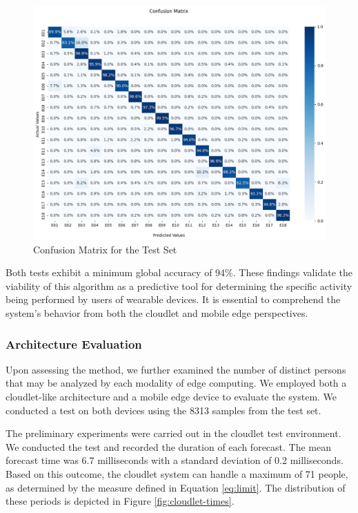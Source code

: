 \begin{figure}[h!]
    \centering
    \includegraphics[width=\linewidth]{Figures/test.png}
    \caption{Confusion Matrix for the Test Set}
    \label{fig:cfmat-tst}
\end{figure}

Both tests exhibit a minimum global accuracy of 94\%. These findings validate the viability of this algorithm as a predictive tool for determining the specific activity being performed by users of wearable devices. It is essential to comprehend the system's behavior from both the cloudlet and mobile edge perspectives.

\subsubsection{Architecture Evaluation}

Upon assessing the method, we further examined the number of distinct persons that may be analyzed by each modality of edge computing. We employed both a cloudlet-like architecture and a mobile edge device to evaluate the system. We conducted a test on both devices using the 8313 samples from the test set.

The preliminary experiments were carried out in the cloudlet test environment. We conducted the test and recorded the duration of each forecast. The mean forecast time was 6.7 milliseconds with a standard deviation of 0.2 milliseconds. Based on this outcome, the cloudlet system can handle a maximum of 71 people, as determined by the measure defined in Equation \ref{eq:limit}. The distribution of these periods is depicted in Figure \ref{fig:cloudlet-times}.

